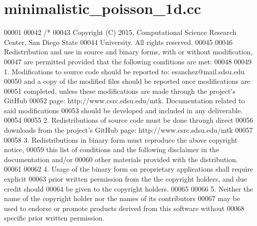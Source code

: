 \hypertarget{minimalistic__poisson__1d_8cc_source}{\section{minimalistic\+\_\+poisson\+\_\+1d.\+cc}
\label{minimalistic__poisson__1d_8cc_source}
}

\begin{DoxyCode}
00001 
00042 \textcolor{comment}{/*}
00043 \textcolor{comment}{Copyright (C) 2015, Computational Science Research Center, San Diego State}
00044 \textcolor{comment}{University. All rights reserved.}
00045 \textcolor{comment}{}
00046 \textcolor{comment}{Redistribution and use in source and binary forms, with or without modification,}
00047 \textcolor{comment}{are permitted provided that the following conditions are met:}
00048 \textcolor{comment}{}
00049 \textcolor{comment}{1. Modifications to source code should be reported to: esanchez@mail.sdsu.edu}
00050 \textcolor{comment}{and a copy of the modified files should be reported once modifications are}
00051 \textcolor{comment}{completed, unless these modifications are made through the project's GitHub}
00052 \textcolor{comment}{page: http://www.csrc.sdsu.edu/mtk. Documentation related to said modifications}
00053 \textcolor{comment}{should be developed and included in any deliverable.}
00054 \textcolor{comment}{}
00055 \textcolor{comment}{2. Redistributions of source code must be done through direct}
00056 \textcolor{comment}{downloads from the project's GitHub page: http://www.csrc.sdsu.edu/mtk}
00057 \textcolor{comment}{}
00058 \textcolor{comment}{3. Redistributions in binary form must reproduce the above copyright notice,}
00059 \textcolor{comment}{this list of conditions and the following disclaimer in the documentation and/or}
00060 \textcolor{comment}{other materials provided with the distribution.}
00061 \textcolor{comment}{}
00062 \textcolor{comment}{4. Usage of the binary form on proprietary applications shall require explicit}
00063 \textcolor{comment}{prior written permission from the the copyright holders, and due credit should}
00064 \textcolor{comment}{be given to the copyright holders.}
00065 \textcolor{comment}{}
00066 \textcolor{comment}{5. Neither the name of the copyright holder nor the names of its contributors}
00067 \textcolor{comment}{may be used to endorse or promote products derived from this software without}
00068 \textcolor{comment}{specific prior written permission.}

\end{DoxyCode}
